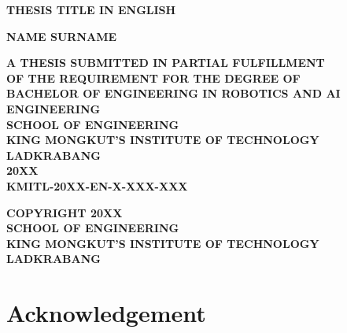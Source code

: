 \documentclass[12pt,a4paper]{report}
\begin{document}
\begin{titlepage}
    \fontsize{18pt}{18pt}\bfseries THESIS TITLE IN ENGLISH \\[1.5em]
    \centering
    \vfill
    \begin{center}
        {\fontsize{16pt}{16pt}\bfseries NAME SURNAME\par}
    \end{center}
    \vfill
    \vfill
    {\fontsize{16pt}{16pt}\bfseries
    A THESIS SUBMITTED IN PARTIAL FULFILLMENT \\ OF THE REQUIREMENT FOR THE DEGREE OF \\ BACHELOR OF ENGINEERING IN ROBOTICS AND AI ENGINEERING \\ SCHOOL OF ENGINEERING \\ KING MONGKUT'S INSTITUTE OF TECHNOLOGY LADKRABANG \\ 20XX \\ KMITL-20XX-EN-X-XXX-XXX}
\end{titlepage}

\newpage
\thispagestyle{empty}
\vspace*{\fill}
    {\fontsize{16pt}{16pt}\bfseries
    \noindent
    COPYRIGHT 20XX \\
    SCHOOL OF ENGINEERING \\
    KING MONGKUT'S INSTITUTE OF TECHNOLOGY LADKRABANG}

\newpage
{}


\chapter*{Acknowledgement}

\cleardoublepage

\tableofcontents
{}
\cleardoublepage
\listoftables
{}
\cleardoublepage
\listoffigures
{}

\cleardoublepage
{}







\cite{zhang2023design}

\cleardoublepage
{}



\appendix

\end{document}
